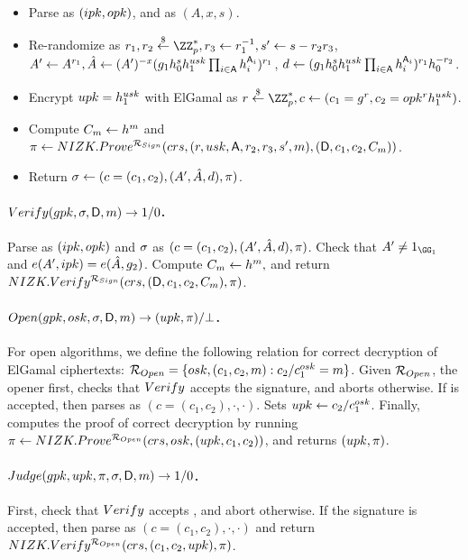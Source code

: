\begin{itemize}
\item Parse \gpk as $(ipk,opk)$, and \cred as $(A,x,s)$.
\item Re-randomize \cred as $r_1,r_2 \getr
  \ZZ^*_p, r_3 \gets r_1^{-1}, s' \gets s - r_2r_3$, $A' \gets A^{r_1},
  \hat{A} \gets (A')^{-x}(g_1h_0^sh_1^{usk}
  \prod_{i \in \mathsf{A}}h_i^{\mathsf{A}_i})^{r_1}$,
  $d \gets (g_1h_0^sh_1^{usk}
  \prod_{i \in \mathsf{A}}h_i^{\mathsf{A}_i})^{r_1}h_0^{-r_2}$.
\item Encrypt $upk=h_1^{usk}$ with ElGamal as $r \getr \ZZ^*_p,
  c \gets (c_1 = \gen{g}^r,c_2 = \opk^r\gen{h}_1^{\usk})$.
\item Compute $C_{m} \gets h^m$ and
  $\pi \gets NIZK.Prove^{\mathcal{R}_{Sign}}(crs,
  (r,usk,\mathsf{A},r_2,r_3,s',m), (\mathsf{D},c_1,c_2,C_{m}))$.
\item Return $\sigma \gets (c=(c_1,c_2),(A',\hat{A},d),\pi)$.
\end{itemize}

\paragraph{$Verify(gpk,\sigma,\mathsf{D},m) \rightarrow 1/0$.} %
Parse \gpk as $(ipk,opk)$ and $\sigma$ as $(c=(c_1,c_2),
(A',\hat{A},d), \pi)$. Check that $A' \neq 1_{\GG_1}$ and $e(A',ipk) =
e(\hat{A},g_2)$. Compute $C_{m} \gets h^m,$ and return
$NIZK.Verify^{\mathcal{R}_{Sign}}(crs,(\mathsf{D},c_1,c_2,C_{m}),
\pi)$.

\paragraph{$Open(gpk,osk,\sigma,\mathsf{D},m)
  \rightarrow (upk,\pi)/\bot$.} %
For open algorithms, we define the following relation for correct decryption of
ElGamal ciphertexts: $\mathcal{R}_{Open} = \lbrace osk,(c_1,c_2,m):
c_2/c_1^{osk} = m \rbrace$. Given $\mathcal{R}_{Open}$, the opener first,
checks that $Verify$ accepts the signature, and aborts otherwise. If \sig
is accepted, then parses \sig as $(c=(c_1,c_2),\cdot,\cdot)$.
Sets $upk \gets c_2/c_1^{osk}$. Finally, computes the proof of correct
decryption by running $\pi \gets NIZK.Prove^{\mathcal{R}_{Open}}(crs,
osk,(upk,c_1,c_2))$, and returns $(upk,\pi)$.

\paragraph{$Judge(gpk,upk,\pi,\sigma,\mathsf{D},m)
  \rightarrow 1/0$.} %
First, check that $Verify$ accepts \sig, and abort otherwise. If the signature
is accepted, then parse \sig as $(c=(c_1,c_2),\cdot,\cdot)$ and return
$NIZK.Verify^{\mathcal{R}_{Open}}(crs,(c_1,c_2,upk),\pi)$.

